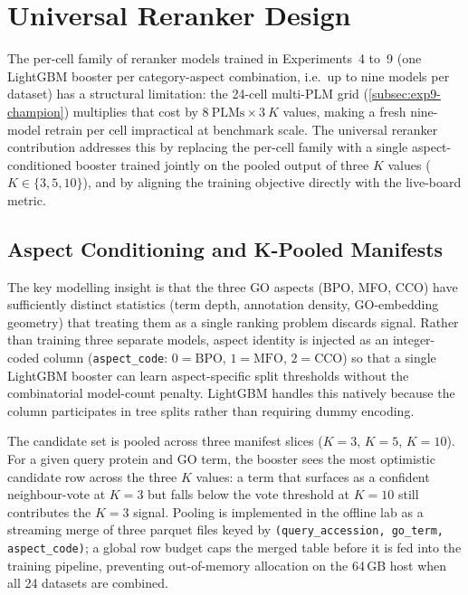 \section{Universal Reranker Design}
\label{sec:universal-reranker-design}

The per-cell family of reranker models trained in Experiments~4 to~9
(one LightGBM booster per category-aspect combination, i.e.\ up to nine
models per dataset) has a structural limitation: the 24-cell multi-PLM grid
(\cref{subsec:exp9-champion}) multiplies that cost by $8~\text{PLMs} \times
3~K$ values, making a fresh nine-model retrain per cell impractical at
benchmark scale. The universal reranker contribution addresses this by
replacing the per-cell family with a single aspect-conditioned booster
trained jointly on the pooled output of three $K$ values ($K \in \{3, 5,
10\}$), and by aligning the training objective directly with the live-board
metric.

\subsection{Aspect Conditioning and K-Pooled Manifests}
\label{subsec:universal-aspect-conditioning}

The key modelling insight is that the three GO aspects (BPO, MFO, CCO) have
sufficiently distinct statistics (term depth, annotation density, GO-embedding
geometry) that treating them as a single ranking problem discards signal.
Rather than training three separate models, aspect identity is injected as an
integer-coded column (\texttt{aspect\_code}: $0 = \text{BPO}$,
$1 = \text{MFO}$, $2 = \text{CCO}$) so that a single LightGBM booster can
learn aspect-specific split thresholds without the combinatorial model-count
penalty. LightGBM handles this natively because the column participates in
tree splits rather than requiring dummy encoding.

The candidate set is pooled across three manifest slices ($K = 3$, $K = 5$,
$K = 10$). For a given query protein and GO term, the booster sees the most
optimistic candidate row across the three $K$ values: a term that surfaces as
a confident neighbour-vote at $K = 3$ but falls below the vote threshold at
$K = 10$ still contributes the $K = 3$ signal. Pooling is implemented in the
offline lab as a streaming merge of three parquet files keyed by
\texttt{(query\_accession, go\_term, aspect\_code)}; a global row budget caps
the merged table before it is fed into the training pipeline, preventing
out-of-memory allocation on the 64\,GB host when all 24 datasets are
combined.

